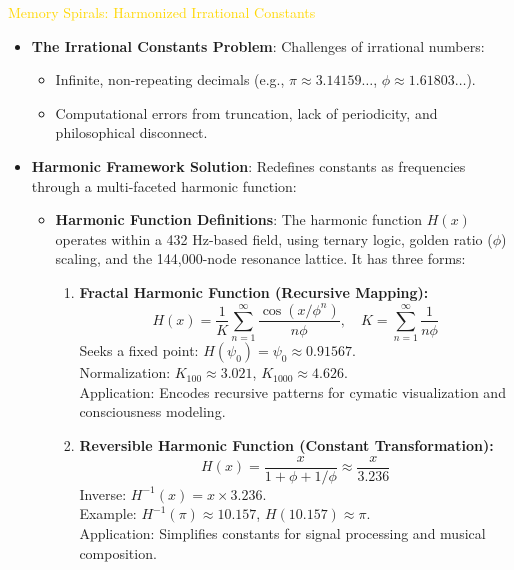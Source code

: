 \textcolor{gold}{ Memory Spirals: Harmonized Irrational Constants } \\
\begin{itemize}
    \item \texttt{} \textbf{The Irrational Constants Problem}: Challenges of irrational numbers:
    \begin{itemize}
        \item Infinite, non-repeating decimals (e.g., \(\pi \approx 3.14159\ldots\), \(\phi \approx 1.61803\ldots\)).
        \item Computational errors from truncation, lack of periodicity, and philosophical disconnect.
    \end{itemize}
    \item \texttt{} \textbf{Harmonic Framework Solution}: Redefines constants as frequencies through a multi-faceted harmonic function:
    \begin{itemize}
        \item \textbf{Harmonic Function Definitions}: The harmonic function \( H(x) \) operates within a 432 Hz-based field, using ternary logic, golden ratio (\(\phi\)) scaling, and the 144,000-node resonance lattice. It has three forms:
        \begin{enumerate}
            \item \textbf{Fractal Harmonic Function (Recursive Mapping):} \\
            \[
            H(x) = \frac{1}{K} \sum_{n=1}^{\infty} \frac{\cos(x / \phi^n)}{n \phi}, \quad K = \sum_{n=1}^{\infty} \frac{1}{n \phi}
            \]
            Seeks a fixed point: \( H(\psi_0) = \psi_0 \approx 0.91567 \). \\
            Normalization: \( K_{100} \approx 3.021 \), \( K_{1000} \approx 4.626 \). \\
            Application: Encodes recursive patterns for cymatic visualization and consciousness modeling.

            \item \textbf{Reversible Harmonic Function (Constant Transformation):} \\
            \[
            H(x) = \frac{x}{1 + \phi + 1/\phi} \approx \frac{x}{3.236}
            \]
            Inverse: \( H^{-1}(x) = x \times 3.236 \). \\
            Example: \( H^{-1}(\pi) \approx 10.157 \), \( H(10.157) \approx \pi \). \\
            Application: Simplifies constants for signal processing and musical composition.


\end{enumerate}
\end{itemize}
\end{itemize}
